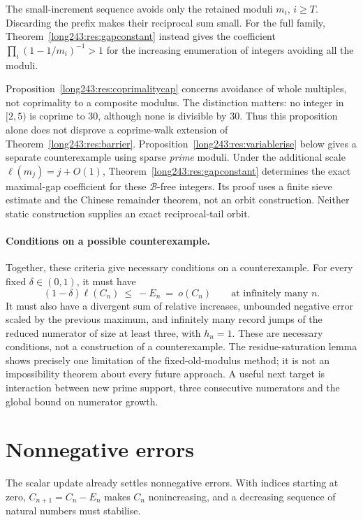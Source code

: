 \documentclass[11pt]{article}
\begin{document}
The small-increment sequence avoids only the retained moduli $m_i$,
$i\ge T$. Discarding the prefix makes their reciprocal sum small.
For the full family, Theorem~\ref{long243:res:gapconstant} instead gives
the coefficient $\prod_i(1-1/m_i)^{-1}>1$ for the increasing enumeration
of integers avoiding all the moduli.


Proposition~\ref{long243:res:coprimalitycap} concerns avoidance of whole
multiples, not coprimality to a composite modulus. The distinction matters:
no integer in $[2,5)$ is coprime to $30$, although none is divisible by $30$.
Thus this proposition alone does not disprove a coprime-walk extension of
Theorem~\ref{long243:res:barrier}. Proposition~\ref{long243:res:variablerise}
below gives a separate counterexample using sparse \emph{prime} moduli.
Under the additional scale $\ell(m_j)=j+O(1)$,
Theorem~\ref{long243:res:gapconstant} determines the exact maximal-gap
coefficient for these $\mathcal B$-free integers. Its proof uses a finite
sieve estimate and the Chinese remainder theorem, not an orbit
construction. Neither static construction supplies an exact
reciprocal-tail orbit.

\paragraph{Conditions on a possible counterexample.}
Together, these criteria give necessary conditions on a counterexample.
For every fixed $\delta\in(0,1)$, it must have
\[
 (1-\delta)\ell(C_n)\ \le\ -E_n\ =\ o(C_n)
 \qquad\text{at infinitely many }n.
\]
It must also have a divergent sum of relative increases, unbounded
negative error scaled by the previous maximum, and infinitely many record
jumps of the reduced numerator of size at least three, with $h_n=1$.
These are necessary conditions, not a construction of a counterexample. The residue-saturation lemma
shows precisely one limitation of the fixed-old-modulus method; it is not
an impossibility theorem about every future approach. A useful next target
is interaction between new prime support, three consecutive numerators and
the global bound on numerator growth.

\section{Nonnegative errors}\label{long243:sec:descent}

The scalar update already settles nonnegative errors. With indices
starting at zero, $C_{n+1}=C_n-E_n$ makes $C_n$ nonincreasing, and
a decreasing sequence of natural numbers must stabilise.
\end{document}

